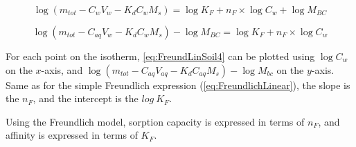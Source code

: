 \begin{equation} \label{eq:FreundLinSoil3}
    \log (m_{tot} - C_{w}V_{w} - K_dC_{w}M_s) = \log K_{F} + n_F \times \log C_{w} + \log M_{BC}
\end{equation}

\begin{equation} \label{eq:FreundLinSoil4}
    \log (m_{tot} - C_{aq}V_{w} - K_dC_{w}M_s) - \log M_{BC} = \log K_{F} + n_F \times \log C_{w}  
\end{equation}

For each point on the isotherm, \cref{eq:FreundLinSoil4} can be plotted using $\log C_{w}$ on the $x$-axis, and $\log (m_{tot} - C_{aq}V_{aq} - K_dC_{aq}M_s) - \log M_{bc}$ on the $y$-axis. Same as for the simple Freundlich expression (\cref{eq:FreundlichLinear}), the slope is the $n_F$, and the intercept is the $log~K_F$. 

Using the Freundlich model, sorption capacity is expressed in terms of \(n_F\), and affinity is expressed in terms of \(K_F\). 

